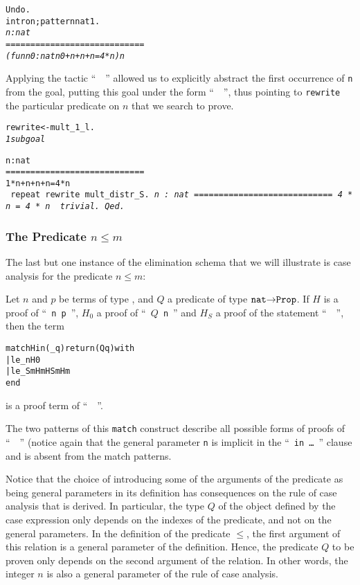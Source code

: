\documentclass[11pt]{article}
\begin{document}
\begin{alltt}
 Undo.
 intro n; pattern n at 1.
 \it
 n : nat
  ============================
 (fun n0 : nat {\funarrow} n0 + n + n + n = 4 * n) n
\end{alltt}
Applying the tactic ``~~'' allowed us
to explicitly abstract the first occurrence of \texttt{n} from the
goal, putting this goal under the form ``~~'',
thus pointing to \texttt{rewrite} the particular predicate on $n$
that we search to prove. 


\begin{alltt}
 rewrite <- mult_1_l.
\it
1 subgoal
  
  n : nat
  ============================
   1 * n + n + n + n = 4 * n
\tt
 repeat rewrite   mult_distr_S.
\it
  n : nat
  ============================
   4 * n = 4 * n
\tt
 trivial.
Qed.
\end{alltt}

\subsubsection{The Predicate $n {\leq} m$}


The last but one instance of the elimination schema that we will illustrate is
case analysis for the predicate $n {\leq} m$:

Let $n$ and $p$ be terms of type , and $Q$ a predicate 
of type $\mbox{\texttt{nat}}\mbox{$\rightarrow$}{}\texttt{Prop}$.
If $H$ is a proof of ``~\texttt{n {\coqle} p}~'',
$H_0$ a proof of ``~\texttt{$Q$  n}~'' and
$H_S$ a proof of the statement ``~~'',
then the term
\begin{alltt}
match H in (_ {\coqle} q) return (Q q) with
    | le_n {\funarrow} H0
    | le_S m Hm {\funarrow} HS m Hm
end
\end{alltt}
 is a proof term of ``~~''.


The two patterns of this \texttt{match} construct describe
all possible forms of proofs of ``~~'' (notice
again that the general parameter \texttt{n} is implicit in
 the ``~\texttt{in \dots}~''
clause and is absent from the match patterns.


Notice that the choice of introducing some of the arguments of the
predicate as being general parameters in its definition has
consequences on the rule of case analysis that is derived. In
particular, the type $Q$ of the object defined by the case expression
only depends on the indexes of the predicate, and not on the general
parameters.  In the definition of the predicate $\leq$, the first
argument of this relation is a general parameter of the
definition. Hence, the predicate $Q$ to be proven only depends on the
second argument of the relation. In other words, the integer $n$ is
also a general parameter of the rule of case analysis.
\end{document}
